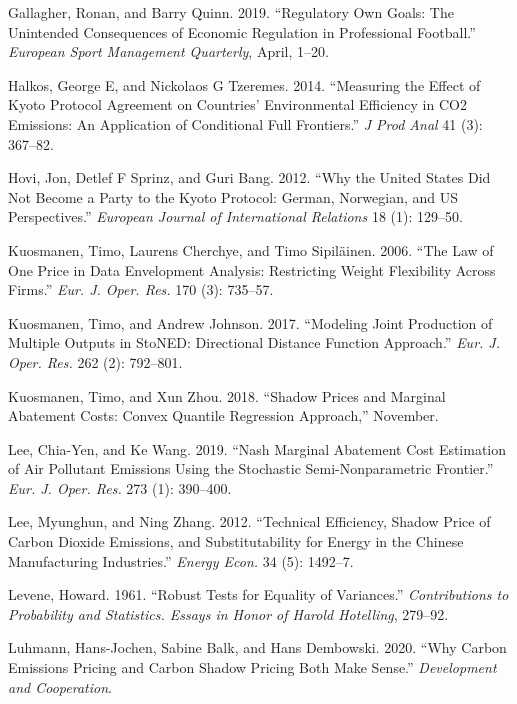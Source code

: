 \documentclass[
  10pt,
]{article}
\begin{document}
\leavevmode\hypertarget{ref-Gallagher2019}{}%
Gallagher, Ronan, and Barry Quinn. 2019. ``Regulatory Own Goals: The
Unintended Consequences of Economic Regulation in Professional
Football.'' \emph{European Sport Management Quarterly}, April, 1--20.

\leavevmode\hypertarget{ref-Halkos2014}{}%
Halkos, George E, and Nickolaos G Tzeremes. 2014. ``Measuring the Effect
of Kyoto Protocol Agreement on Countries' Environmental Efficiency in
CO2 Emissions: An Application of Conditional Full Frontiers.'' \emph{J
Prod Anal} 41 (3): 367--82.

\leavevmode\hypertarget{ref-Hovi2012}{}%
Hovi, Jon, Detlef F Sprinz, and Guri Bang. 2012. ``Why the United States
Did Not Become a Party to the Kyoto Protocol: German, Norwegian, and US
Perspectives.'' \emph{European Journal of International Relations} 18
(1): 129--50.

\leavevmode\hypertarget{ref-Kuosmanen2006}{}%
Kuosmanen, Timo, Laurens Cherchye, and Timo Sipiläinen. 2006. ``The Law
of One Price in Data Envelopment Analysis: Restricting Weight
Flexibility Across Firms.'' \emph{Eur. J. Oper. Res.} 170 (3): 735--57.

\leavevmode\hypertarget{ref-Kuosmanen2017}{}%
Kuosmanen, Timo, and Andrew Johnson. 2017. ``Modeling Joint Production
of Multiple Outputs in StoNED: Directional Distance Function Approach.''
\emph{Eur. J. Oper. Res.} 262 (2): 792--801.

\leavevmode\hypertarget{ref-Kuosmanen2018b}{}%
Kuosmanen, Timo, and Xun Zhou. 2018. ``Shadow Prices and Marginal
Abatement Costs: Convex Quantile Regression Approach,'' November.

\leavevmode\hypertarget{ref-Lee2019}{}%
Lee, Chia-Yen, and Ke Wang. 2019. ``Nash Marginal Abatement Cost
Estimation of Air Pollutant Emissions Using the Stochastic
Semi-Nonparametric Frontier.'' \emph{Eur. J. Oper. Res.} 273 (1):
390--400.

\leavevmode\hypertarget{ref-Lee2012}{}%
Lee, Myunghun, and Ning Zhang. 2012. ``Technical Efficiency, Shadow
Price of Carbon Dioxide Emissions, and Substitutability for Energy in
the Chinese Manufacturing Industries.'' \emph{Energy Econ.} 34 (5):
1492--7.

\leavevmode\hypertarget{ref-Levene1961}{}%
Levene, Howard. 1961. ``Robust Tests for Equality of Variances.''
\emph{Contributions to Probability and Statistics. Essays in Honor of
Harold Hotelling}, 279--92.

\leavevmode\hypertarget{ref-Luhmann2020}{}%
Luhmann, Hans-Jochen, Sabine Balk, and Hans Dembowski. 2020. ``Why
Carbon Emissions Pricing and Carbon Shadow Pricing Both Make Sense.''
\emph{Development and Cooperation}.
\end{document}
